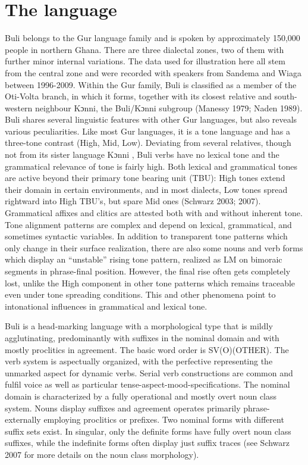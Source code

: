 \documentclass[output=paper]{langsci/langscibook}
\begin{document}
\section{ The language}

Buli belongs to the Gur language family and is spoken by approximately 150,000 people \citep{LewisEtAl2015} in northern Ghana. There are three dialectal zones, two of them with further minor internal variations. The data used for illustration here all stem from the central zone and were recorded with speakers from Sandema and Wiaga between 1996-2009. Within the Gur family, Buli is classified as a member of the Oti-Volta branch, in which it forms, together with its closest relative and south-western neighbour Kɔnni, the Buli/Kɔnni subgroup (Manessy 1979; Naden 1989). Buli shares several linguistic features with other Gur languages, but also reveals various peculiarities. Like most Gur languages, it is a tone language and has a three-tone contrast (High, Mid, Low). Deviating from several relatives, though not from its sister language Kɔnni \citep{Cahill2007}, Buli verbs have no lexical tone and the grammatical relevance of tone is fairly high. Both lexical and grammatical tones are active beyond their primary tone bearing unit (TBU): High tones extend their domain in certain environments, and in most dialects, Low tones spread rightward into High TBU’s, but spare Mid ones (Schwarz 2003; 2007). Grammatical affixes and clitics are attested both with and without inherent tone. Tone alignment patterns are complex and depend on lexical, grammatical, and sometimes syntactic variables. In addition to transparent tone patterns which only change in their surface realization, there are also some nouns and verb forms which display an “unstable” rising tone pattern, realized as LM on bimoraic segments in phrase-final position. However, the final rise often gets completely lost, unlike the High component in other tone patterns which remains traceable even under tone spreading conditions. This and other phenomena point to intonational influences in grammatical and lexical tone.

Buli is a head-marking language with a morphological type that is mildly agglutinating, predominantly with suffixes in the nominal domain and with mostly proclitics in agreement. The basic word order is SV(O)(OTHER). The verb system is aspectually organized, with the perfective representing the unmarked aspect for dynamic verbs. Serial verb constructions are common and fulfil voice as well as particular tense-aspect-mood-specifications. The nominal domain is characterized by a fully operational and mostly overt noun class system. Nouns display suffixes and agreement operates primarily phrase-externally employing proclitics or prefixes. Two nominal forms with different suffix sets exist. In singular, only the definite forms have fully overt noun class suffixes, while the indefinite forms often display just suffix traces (see Schwarz 2007 for more details on the noun class morphology).
\end{document}
